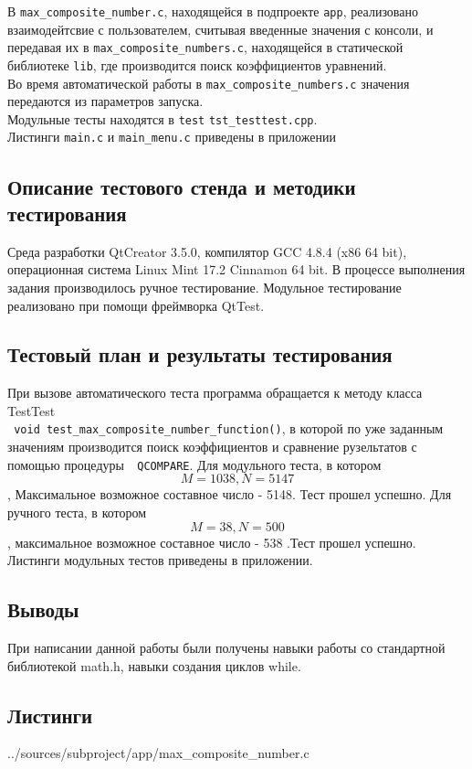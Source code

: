 \documentclass[12pt,a4paper]{report}
\begin{document}
В \verb+max_composite_number.c+, находящейся в подпроекте \verb+app+,  реализовано взаимодейтсвие с пользователем, считывая введенные значения с консоли, и передавая их в \verb+max_composite_numbers.c+, находящейся в статической библиотеке \verb+lib+, где производится поиск коэффициентов уравнений.\\
Во время автоматической работы в \verb+max_composite_numbers.c+ значения передаются из параметров запуска.\\
Модульные тесты находятся в \verb+test+ \verb+tst_testtest.cpp+.\\
Листинги \verb+main.c+ и \verb+main_menu.c+ приведены в приложении
\subsection{Описание тестового стенда и методики тестирования}
Среда разработки QtCreator 3.5.0, компилятор GCC 4.8.4 (x86 64 bit), операционная система Linux Mint 17.2 Cinnamon 64 bit.
В процессе выполнения задания производилось ручное тестирование.
Модульное тестирование реализовано при помощи фреймворка QtTest.

\subsection{Тестовый план и результаты тестирования}
При вызове автоматического теста программа обращается к методу класса TestTest \\ \verb+ void test_max_composite_number_function()+, в которой по уже заданным значениям производится поиск коэффициентов и сравнение рузельтатов с помощью процедуры\verb+  QCOMPARE+.
Для модульного теста, в котором  
\begin{equation}
M=1038,N=5147
\end{equation},
Максимальное возможное составное число - 5148. Тест прошел успешно.
Для ручного теста, в котором \begin{equation}M=38,N=500
\end{equation}, максимальное возможное составное число - 538 .Тест прошел успешно.
Листинги модульных тестов приведены в приложении.
\subsection{Выводы}
При написании данной работы были получены навыки работы со стандартной библиотекой math.h, навыки создания циклов while.
\subsection*{Листинги}

{../sources/subproject/app/max_composite_number.c}
\end{document}
